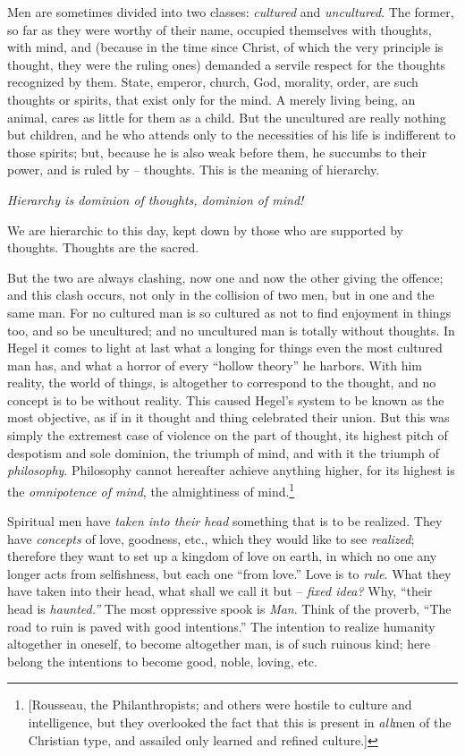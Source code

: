 \documentclass[12pt,a4paper]{book}
\begin{document}
Men are sometimes divided into two classes: \textit{cultured} and 
\textit{uncultured}. The former, so far as they were worthy of their name, 
occupied themselves with thoughts, with mind, and (because in the time since 
Christ, of which the very principle is thought, they were the ruling ones) 
demanded a servile respect for the thoughts recognized by them. State, 
emperor, church, God, morality, order, are such thoughts or spirits, that 
exist only for the mind. A merely living being, an animal, cares as little for 
them as a child. But the uncultured are really nothing but children, and he 
who attends only to the necessities of his life is indifferent to those 
spirits; but, because he is also weak before them, he succumbs to their power, 
and is ruled by -- thoughts. This is the meaning of hierarchy.

\textit{Hierarchy is dominion of thoughts, dominion of mind!}

We are hierarchic to this day, kept down by those who are supported by 
thoughts. Thoughts are the sacred.

But the two are always clashing, now one and now the other giving the offence; 
and this clash occurs, not only in the collision of two men, but in one and 
the same man. For no cultured man is so cultured as not to find enjoyment in 
things too, and so be uncultured; and no uncultured man is totally without 
thoughts. In Hegel it comes to light at last what a longing for things even 
the most cultured man has, and what a horror of every ``hollow theory'' he 
harbors. With him reality, the world of things, is altogether to correspond to 
the thought, and no concept is to be without reality. This caused Hegel's 
system to be known as the most objective, as if in it thought and thing 
celebrated their union. But this was simply the extremest case of violence on 
the part of thought, its highest pitch of despotism and sole dominion, the 
triumph of mind, and with it the triumph of \textit{philosophy}. Philosophy 
cannot hereafter achieve anything higher, for its highest is the 
\textit{omnipotence of mind}, the almightiness of mind.\footnote{[Rousseau, 
the Philanthropists; and others were hostile to culture and intelligence, but 
they overlooked the fact that this is present in \textit{all}men of the 
Christian type, and assailed only learned and refined culture.]}

Spiritual men have \textit{taken into their head} something that is to be 
realized. They have \textit{concepts} of love, goodness, etc., which they 
would like to see \textit{realized}; therefore they want to set up a kingdom 
of love on earth, in which no one any longer acts from selfishness, but each 
one ``from love.'' Love is to \textit{rule}. What they have taken into their 
head, what shall we call it but -- \textit{fixed idea?} Why, ``their head is 
\textit{haunted.''} The most oppressive spook is \textit{Man}. Think of the 
proverb, ``The road to ruin is paved with good intentions.'' The intention 
to realize humanity altogether in oneself, to become altogether man, is of 
such ruinous kind; here belong the intentions to become good, noble, loving, 
etc.
\end{document}
